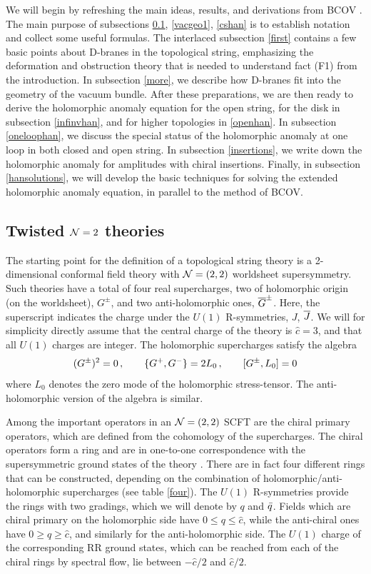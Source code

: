 We will begin by refreshing the main ideas, results, and derivations from 
BCOV \cite{bcov2}. The main purpose of subsections \ref{Neq2twisted}, 
\ref{vacgeo1}, \ref{cshan} is to establish notation and collect some 
useful formulas. The interlaced subsection \ref{first} contains a
few basic points about D-branes in the topological string, emphasizing
the deformation and obstruction theory that is needed to understand
fact (F1) from the introduction. In subsection \ref{more}, we 
describe how D-branes fit into the geometry of the vacuum bundle.
After these preparations, we are then ready to derive the
holomorphic anomaly equation for the open string, for the disk 
in subsection \ref{infinvhan}, and for higher topologies in 
\ref{openhan}. In subsection \ref{oneloophan},
we discuss the special status of the holomorphic anomaly at one
loop in both closed and open string. In subsection \ref{insertions},
we write down the holomorphic anomaly for amplitudes with chiral
insertions. Finally, in subsection \ref{hansolutions}, we will
develop the basic techniques for solving the extended holomorphic
anomaly equation, in parallel to the method of BCOV.


\subsection{Twisted \texorpdfstring{${\cal N}=2$}{N=2} theories}
\label{Neq2twisted}


The starting point for the definition of a topological string theory is a
2-dimensional conformal field theory with ${\cal N}=(2,2)$ worldsheet
supersymmetry. Such theories have a total of four real supercharges,
two of holomorphic origin (on the worldsheet), $G^\pm$, and two 
anti-holomorphic ones, ${\overline G}^\pm$. Here, the superscript indicates the 
charge under the $U(1)$ R-symmetries, $J$, ${\overline J}$. We will for simplicity
directly assume that the central charge of the theory is $\hat c=3$, and
that all $U(1)$ charges are integer. The holomorphic supercharges satisfy 
the algebra
\begin{equation}
\eqlabel{algebra}
(G^\pm)^2=0 \,, \qquad \{G^+,G^-\} = 2 L_0 \,, \qquad
[G^\pm ,L_0] = 0
\end{equation}
where $L_0$ denotes the zero mode of the holomorphic stress-tensor. The 
anti-holomorphic version of the algebra is similar.

Among the important operators in an ${\cal N}=(2,2)$ SCFT are the chiral primary
operators, which are defined from the cohomology of the supercharges. The 
chiral operators form a ring and are in one-to-one correspondence with the 
supersymmetric ground states of the theory \cite{lvw}. There are in fact four 
different rings that can be constructed, depending on the combination of 
holomorphic/anti-holomorphic supercharges (see table \ref{four}). The $U(1)$
R-symmetries provide the rings with two gradings, which we will denote by $q$ 
and ${\bar q}$. Fields which are chiral primary on the holomorphic side have
$0\le q\le \hat c$, while the anti-chiral ones have $0\ge q\ge\hat c$, and
similarly for the anti-holomorphic side. The $U(1)$ charge of the corresponding
RR ground states, which can be reached from each of the chiral rings by spectral 
flow, lie between $-\hat c/2$ and $\hat c/2$.

